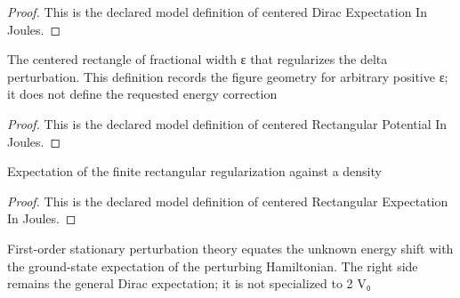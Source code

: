 \begin{proof}
  This is the declared model definition of centered Dirac Expectation In Joules.
\end{proof}
\begin{definition}
  \label{def:physics:phyx-mini-0546:phyxminiproblems-problemphyxmini0546-centeredrectangularpotentialinjoules}
  The centered rectangle of fractional width ε that regularizes the delta perturbation. This definition records the figure geometry for arbitrary positive ε; it does not define the requested energy correction
\end{definition}
\begin{proof}
  This is the declared model definition of centered Rectangular Potential In Joules.
\end{proof}
\begin{definition}
  \label{def:physics:phyx-mini-0546:phyxminiproblems-problemphyxmini0546-centeredrectangularexpectationinjoules}
  Expectation of the finite rectangular regularization against a density
\end{definition}
\begin{proof}
  This is the declared model definition of centered Rectangular Expectation In Joules.
\end{proof}
\begin{definition}
  \label{def:physics:phyx-mini-0546:phyxminiproblems-problemphyxmini0546-satisfiesfirstordercentereddiracperturbationlaw}
  First-order stationary perturbation theory equates the unknown energy shift with the ground-state expectation of the perturbing Hamiltonian. The right side remains the general Dirac expectation; it is not specialized to 2 V₀
\end{definition}
